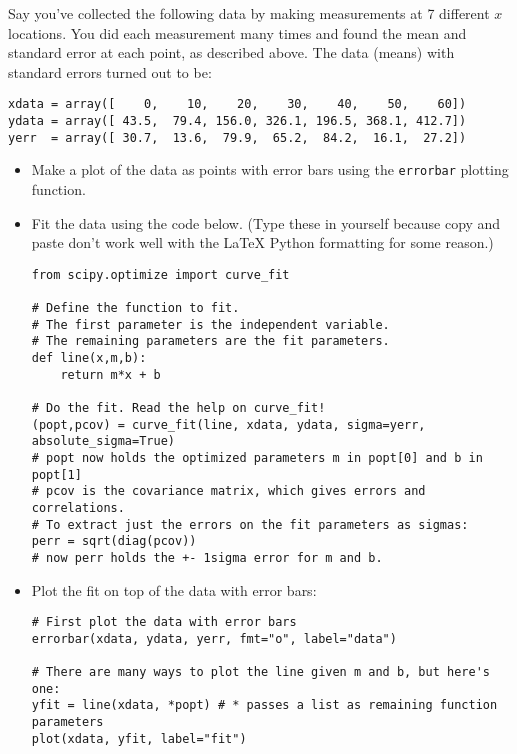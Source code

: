 \documentclass[11pt]{hmcpset}
\begin{document}
	\pagebreak
\begin{problem}

Say you've collected the following data by making measurements at 7 different $x$ locations. You did each measurement many times and found the mean and standard error at each point, as described above. The data (means) with standard errors turned out to be:
\begin{lstlisting}[style=Python]
xdata = array([    0,    10,    20,    30,    40,    50,    60])
ydata = array([ 43.5,  79.4, 156.0, 326.1, 196.5, 368.1, 412.7])
yerr  = array([ 30.7,  13.6,  79.9,  65.2,  84.2,  16.1,  27.2])
\end{lstlisting}
\vspace{-1.5em}
	\begin{itemize}
		\item Make a plot of the data as points with error bars using the \texttt{errorbar} plotting function.
		\item Fit the data using the code below. (Type these in yourself because copy and paste don't work well with the LaTeX Python formatting for some reason.)
\begin{lstlisting}[style=Python]
from scipy.optimize import curve_fit

# Define the function to fit.
# The first parameter is the independent variable.
# The remaining parameters are the fit parameters.
def line(x,m,b):
    return m*x + b

# Do the fit. Read the help on curve_fit!
(popt,pcov) = curve_fit(line, xdata, ydata, sigma=yerr, absolute_sigma=True)
# popt now holds the optimized parameters m in popt[0] and b in popt[1]
# pcov is the covariance matrix, which gives errors and correlations.
# To extract just the errors on the fit parameters as sigmas:
perr = sqrt(diag(pcov))
# now perr holds the +- 1sigma error for m and b.
\end{lstlisting}
\vspace{-1em}
		\item Plot the fit on top of the data with error bars:
\begin{lstlisting}[style=Python]
# First plot the data with error bars
errorbar(xdata, ydata, yerr, fmt="o", label="data")

# There are many ways to plot the line given m and b, but here's one:
yfit = line(xdata, *popt) # * passes a list as remaining function parameters
plot(xdata, yfit, label="fit")


\end{lstlisting}
\end{itemize}
\end{problem}
\end{document}
